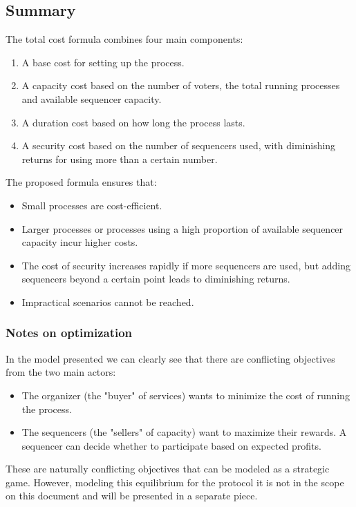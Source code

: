 \subsection{Summary}

The total cost formula combines four main components:

\begin{enumerate}
	\item A base cost for setting up the process.
	\item A capacity cost based on the number of voters, the total running processes and available sequencer capacity.
	\item A duration cost based on how long the process lasts.
	\item A security cost based on the number of sequencers used, with diminishing returns for using more than a certain number.
\end{enumerate}

The proposed formula ensures that:

\begin{itemize}
	\item Small processes are cost-efficient.
	\item Larger processes or processes using a high proportion of available sequencer capacity incur higher costs.
	\item The cost of security increases rapidly if more sequencers are used, but adding sequencers beyond a certain point leads to diminishing returns.
	\item Impractical scenarios cannot be reached.
\end{itemize}

\subsubsection{Notes on optimization}

In the model presented we can clearly see that there are conflicting objectives from the two main actors:

\begin{itemize}
	\item The organizer (the "buyer" of services) wants to minimize the cost of running the process.
	\item The sequencers (the "sellers" of capacity) want to maximize their rewards. A sequencer can decide whether to participate based on expected profits.
\end{itemize}

These are naturally conflicting objectives that can be modeled as a strategic game. However, modeling this equilibrium for the protocol it is not in the scope on this document and will be presented in a separate piece.
